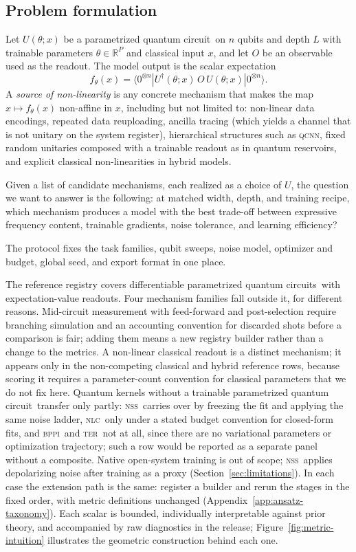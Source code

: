 \documentclass{article}
\newcommand{\nlc}{\textsc{nlc}}
\newcommand{\bppi}{\textsc{bppi}}
\newcommand{\nss}{\textsc{nss}}
\newcommand{\ter}{\textsc{ter}}
\newcommand{\pqc}{parametrized quantum circuit}
\newcommand{\pqcs}{parametrized quantum circuits}
\begin{document}
\subsection{Problem formulation}
\label{sec:problem-formulation}

Let $U(\theta; x)$ be a \pqc\ on $n$ qubits and depth $L$ with trainable parameters $\theta \in \mathbb{R}^P$ and classical input $x$, and let $O$ be an observable used as the readout.
The model output is the scalar expectation
\begin{equation}
    f_\theta(x) = \langle 0^{\otimes n} | U^\dagger(\theta; x) \, O \, U(\theta; x) | 0^{\otimes n} \rangle.
    \label{eq:model}
\end{equation}
A \emph{source of non-linearity} is any concrete mechanism that makes the map $x \mapsto f_\theta(x)$ non-affine in $x$, including but not limited to: non-linear data encodings, repeated data reuploading, ancilla tracing (which yields a channel that is not unitary on the system register), hierarchical structures such as \textsc{qcnn}, fixed random unitaries composed with a trainable readout as in quantum reservoirs, and explicit classical non-linearities in hybrid models.

Given a list of candidate mechanisms, each realized as a choice of $U$, the question we want to answer is the following: at matched width, depth, and training recipe, which mechanism produces a model with the best trade-off between expressive frequency content, trainable gradients, noise tolerance, and learning efficiency?

The protocol fixes the task families, qubit sweeps, noise model, optimizer and budget, global seed, and export format in one place.

The reference registry covers differentiable \pqcs\ with expectation-value readouts.
Four mechanism families fall outside it, for different reasons.
Mid-circuit measurement with feed-forward and post-selection require branching simulation and an accounting convention for discarded shots before a comparison is fair; adding them means a new registry builder rather than a change to the metrics.
A non-linear classical readout is a distinct mechanism; it appears only in the non-competing classical and hybrid reference rows, because scoring it requires a parameter-count convention for classical parameters that we do not fix here.
Quantum kernels without a trainable \pqc\ transfer only partly: \nss\ carries over by freezing the fit and applying the same noise ladder, \nlc\ only under a stated budget convention for closed-form fits, and \bppi\ and \ter\ not at all, since there are no variational parameters or optimization trajectory; such a row would be reported as a separate panel without a composite.
Native open-system training is out of scope; \nss\ applies depolarizing noise after training as a proxy (Section~\ref{sec:limitations}).
In each case the extension path is the same: register a builder and rerun the stages in the fixed order, with metric definitions unchanged (Appendix~\ref{app:ansatz-taxonomy}).
Each scalar is bounded, individually interpretable against prior theory, and accompanied by raw diagnostics in the release; Figure~\ref{fig:metric-intuition} illustrates the geometric construction behind each one.
\end{document}
